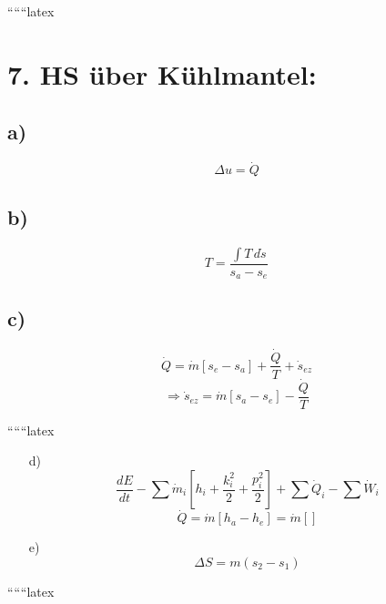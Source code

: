 
``````latex

\section*{7. HS über Kühlmantel:}

\subsection*{a)}
\[
\Delta u = \dot{Q}
\]

\subsection*{b)}
\[
T = \frac{\int T \, d\dot{s}}{s_a - s_e}
\]

\subsection*{c)}
\[
\dot{Q} = \dot{m} \left[ s_e - s_a \right] + \frac{\dot{Q}}{T} + \dot{s}_{ez}
\]
\[
\Rightarrow \dot{s}_{ez} = \dot{m} \left[ s_a - s_e \right] - \frac{\dot{Q}}{T}
\]

``````latex

\begin{itemize}
    \item[d)] 
    \[
    \frac{dE}{dt} - \sum \dot{m}_i \left[ h_i + \frac{k_i^2}{2} + \frac{p_i^2}{2} \right] + \sum \dot{Q}_i - \sum \dot{W}_i
    \]
    \[
    \dot{Q} = \dot{m} \left[ h_a - h_e \right] = \dot{m} \left[ \right]
    \]
    \item[e)] 
    \[
    \Delta S = m (s_2 - s_1)
    \]
\end{itemize}

``````latex



